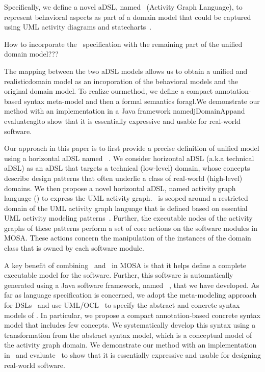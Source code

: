 Specifically, we define a novel aDSL, named \agl~(Activity Graph Language), to represent behavioral aspects as part of a domain model that could be captured using UML activity diagrams and statecharts~\cite{omg_unified_2015}. 

How to incorporate the \agl~specification with the remaining part of the unified domain model???

%

The mapping between the two aDSL models allows us to obtain a unified and realisticdomain model as an incoporation of the behavioral models and the original domain model. To realize ourmethod, we define a compact annotation-based syntax meta-model and then a formal semantics foragl.We demonstrate our method with an implementation in a Java framework namedjDomainAppand evaluateaglto show that it is essentially expressive and usable for real-world software.

Our approach in this paper is to first provide a precise definition of unified model using a horizontal aDSL named \dcsl~\cite{le_domain_2018}. We consider horizontal aDSL (a.k.a technical aDSL) as an aDSL that targets a technical (low-level) domain, whose concepts describe design patterns that often underlie a class of real-world (high-level) domains. 
%
We then propose a novel horizontal aDSL, named activity graph language (\agl) to express the UML activity graph. \agl~is scoped around a restricted domain of the UML activity graph language that is defined based on essential UML activity modeling patterns~\cite{omg_unified_2015}. 
Further, the executable nodes of the activity graphs of these patterns perform a set of core actions on the software modules in MOSA. These actions concern the manipulation of the instances of the domain class that is owned by each software module.

A key benefit of combining \dcsl~and \agl~in MOSA is that it helps define a complete executable model for the software. Further, this software is automatically generated using a Java software framework, named \jdomainapp~\cite{le_jdomainapp_2017}, that we have developed.
%
As far as language specification is concerned, we adopt the meta-modeling approach for DSLs~\cite{kleppe_software_2008} and use UML/OCL~\cite{omg_unified_2015, omg_object_2014} to specify the abstract and concrete syntax models of \agl. In particular, we propose a compact annotation-based concrete syntax model that includes few concepts. We systematically develop this syntax using a transformation from the abstract syntax model, which is a conceptual model of the activity graph domain.
%
We demonstrate our method with an implementation in \jdomainapp~and evaluate \agl~to show that it is essentially expressive and usable for designing real-world software. 

